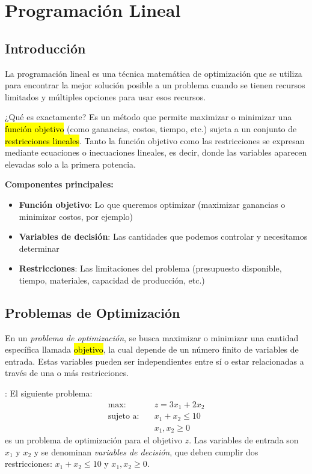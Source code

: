 \section{Programación Lineal}

\subsection{Introducción}

La programación lineal es una técnica matemática de optimización que se utiliza para encontrar la mejor solución posible a un problema cuando se tienen recursos limitados y múltiples opciones para usar esos recursos.

¿Qué es exactamente? Es un método que permite maximizar o minimizar una \hl{función objetivo} (como ganancias, costos, tiempo, etc.) sujeta a un conjunto de \hl{restricciones lineales}. Tanto la función objetivo como las restricciones se expresan mediante ecuaciones o inecuaciones lineales, es decir, donde las variables aparecen elevadas solo a la primera potencia.

\noindent\textbf{Componentes principales:}
\begin{itemize}
  \item \textbf{Función objetivo}: Lo que queremos optimizar (maximizar ganancias o minimizar costos, por ejemplo)
  \item \textbf{Variables de decisión}: Las cantidades que podemos controlar y necesitamos determinar
  \item \textbf{Restricciones}: Las limitaciones del problema (presupuesto disponible, tiempo, materiales, capacidad de producción, etc.)
\end{itemize}

\subsection{Problemas de Optimización}

En un \textit{problema de optimización}, se busca maximizar o minimizar una cantidad específica llamada \hl{objetivo}, la cual depende de un número finito de variables de entrada. Estas variables pueden ser independientes entre sí o estar relacionadas a través de una o más restricciones.

\ejemplo\label{ej:ppl_lineal}: El siguiente problema:
\begin{align*}
  \text{max:} \quad         &z = 3x_1 + 2x_2 \\[3pt]
  \text{sujeto a:} \quad    &x_1 + x_2 \leq 10 \\
                            &x_1,x_2 \geq 0
\end{align*}
es un problema de optimización para el objetivo \(z\). Las variables de entrada son \(x_1\) y \(x_2\) y se denominan \textit{variables de decisión}, que deben cumplir dos restricciones: \(x_1 + x_2 \leq 10\) y \(x_1,x_2 \geq 0\).

